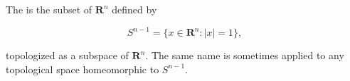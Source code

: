 The  is the subset of $\mathbf{R}^n$ defined by

$$S^{n-1} = \{x \in \mathbf{R}^n : |x| = 1\},$$

topologized as a subspace of $\mathbf{R}^n$. The same name is sometimes applied to any topological space homeomorphic to $S^{n-1}$.
